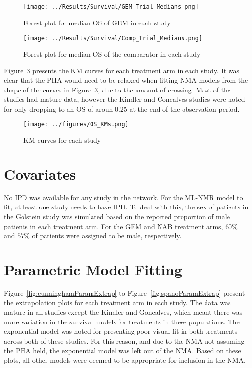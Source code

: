 \begin{figure}[h]
    \centering
    \texttt{[image: ../Results/Survival/GEM\_Trial\_Medians.png]} 
    \caption{Forest plot for median OS of GEM in each study}
    \label{fig:GEMMedForest}
\end{figure}

\begin{figure}[h]
    \centering
    \texttt{[image: ../Results/Survival/Comp\_Trial\_Medians.png]} 
    \caption{Forest plot for median OS of the comparator in each study}
    \label{fig:CompMedForest}
\end{figure}

Figure~\ref{fig:OSKMs} presents the KM curves for each treatment arm in each study. It was clear that the PHA would need to be relaxed when fitting NMA models from the shape of the curves in Figure~\ref{fig:OSKMs}, due to the amount of crossing. Most of the studies had mature data, however the Kindler and Concalves studies were noted for only dropping to an OS of aroun 0.25 at the end of the observation period.

\begin{figure}[h]
    \centering
    \texttt{[image: ../figures/OS\_KMs.png]} 
    \caption{KM curves for each study}
    \label{fig:OSKMs}
\end{figure}

\section{Covariates}
No IPD was available for any study in the network. For the ML-NMR model to fit, at least one study needs to have IPD. To deal with this, the sex of patients in the Golstein study was simulated based on the reported proportion of male patients in each treatment arm. For the GEM and NAB treatment arms, $60\%$ and $57\%$ of patients were assigned to be male, respectively. 

\section{Parametric Model Fitting}

Figure~\ref{fig:cunninghamParamExtrap} to Figure~\ref{fig:spanoParamExtrap} present the extrapolation plots for each treatment arm in each study. The data was mature in all studies except the Kindler and Goncalves, which meant there was more variation in the survival models for treatments in these populations. The exponential model was noted for presenting poor visual fit in both treatments across both of these studies. For this reason, and due to the NMA not assuming the PHA held, the exponential model was left out of the NMA. Based on these plots, all other models were deemed to be appropriate for inclusion in the NMA. \\

